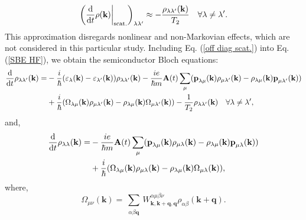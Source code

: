 \documentclass[12pt,english,a4paper]{article}
\begin{document}
\begin{equation}
	\label{off diag scat.}
	\bigg(\dv{ }{t} \rho(\textbf{k})\bigg|_{\mathrm{scat.}}\bigg)_{\lambda \lambda'} \approx -\frac{\rho_{\lambda \lambda'}(\textbf{k})}{T_2}\quad \forall \lambda \neq \lambda'. 
\end{equation}
\quad This approximation disregards nonlinear and non-Markovian effects\cite{haug_quantum_2009}, which are not considered in this particular study. Including Eq. (\ref{off diag scat.}) into Eq. (\ref{SBE HF}), we obtain the semiconductor Bloch equations\cite{haug_quantum_2009}:
\begin{align}
	\label{SBE}
	\dv{ }{t}\rho_{\lambda\lambda'}(\textbf{k}) = &- \frac{i}{\hbar} (\varepsilon_\lambda(\textbf{k}) - \varepsilon_{\lambda'} (\textbf{k}))\rho_{\lambda \lambda'}(\textbf{k}) - \frac{ie}{\hbar m} \textbf{A}(t)\sum_{\mu}(\textbf{p}_{\lambda\mu}(\textbf{k})\rho_{\mu \lambda'}(\textbf{k}) - \rho_{\lambda\mu}(\textbf{k})\textbf{p}_{\mu \lambda'}(\textbf{k})) \nonumber \\
	&+ \frac{i}{\hbar}(\Omega_{\lambda \mu}(\textbf{k})\rho_{\mu \lambda'}(\textbf{k}) - \rho_{\lambda\mu}(\textbf{k}) \Omega_{\mu \lambda'} (\textbf{k})) -\frac{1}{T_2}\rho_{\lambda\lambda'}(\textbf{k})\quad \forall \lambda\neq\lambda',
\end{align}
and,
\begin{align}
	\label{SBE diag}
	\dv{ }{t}\rho_{\lambda\lambda}(\textbf{k}) = & - \frac{ie}{\hbar m} \textbf{A}(t)\sum_{\mu}(\textbf{p}_{\lambda\mu}(\textbf{k})\rho_{\mu \lambda}(\textbf{k}) - \rho_{\lambda\mu}(\textbf{k})\textbf{p}_{\mu \lambda}(\textbf{k})) \nonumber \\
	&+ \frac{i}{\hbar}(\Omega_{\lambda \mu}(\textbf{k})\rho_{\mu \lambda}(\textbf{k}) - \rho_{\lambda\mu}(\textbf{k}) \Omega_{\mu \lambda} (\textbf{k})),
\end{align}
\quad where,
\begin{equation}
	\Omega_{\mu\nu} (\textbf{k})=\sum_{\substack{\alpha\beta \textbf{q}}} W^{\alpha \mu \beta \nu}_{\textbf{k},\textbf{k}+\textbf{q},\textbf{q}} \rho_{\alpha\beta} (\textbf{k}+\textbf{q}).
\end{equation}
\end{document}
